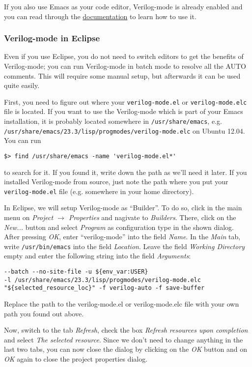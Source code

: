 If you also use Emacs as your code editor,
Verilog-mode is already enabled and you can read through the
\href{http://www.veripool.org/wiki/verilog-mode/Documentation}{documentation} to
learn how to use it.

\subsubsection{Verilog-mode in Eclipse}

Even if you use Eclipse, you do not need to switch editors to get the
benefits of Verilog-mode; you can run Verilog-mode in batch mode to
resolve all the AUTO comments. This will require some manual setup, but
afterwards it can be used quite easily.

First, you need to figure out where your \verb|verilog-mode.el| or
\verb|verilog-mode.elc| file is located. If you want to use the
Verilog-mode which is part of your Emacs installation, it is probably located
somewhere in \verb|/usr/share/emacs|, e.g.
\verb|/usr/share/emacs/23.3/lisp/progmodes/verilog-mode.elc| on Ubuntu 12.04.
You can run
\begin{verbatim}
$> find /usr/share/emacs -name 'verilog-mode.el*'
\end{verbatim}
to search for it. If you found it, write down the path as we'll need it later.
If you installed Verilog-mode from source, just note the path where you put
your \verb|verilog-mode.el| file (e.g. somewhere in your home directory).

In Eclipse, we will setup Verilog-mode as ``Builder''. To do so, click in the
main menu on \emph{Project $\rightarrow$ Properties} and nagivate to
\emph{Builders}. There, click on the \emph{New...} button and select
\emph{Program} as configuration type in the shown dialog. After pressing
\emph{OK}, enter ``verilog-mode'' into the field \emph{Name}. In the \emph{Main}
tab, write \verb|/usr/bin/emacs| into the field \emph{Location}. Leave the field
\emph{Working Directory} empty and enter the following string into the field
\emph{Arguments}:
\begin{verbatim}
--batch --no-site-file -u ${env_var:USER}
-l /usr/share/emacs/23.3/lisp/progmodes/verilog-mode.elc
"${selected_resource_loc}" -f verilog-auto -f save-buffer
\end{verbatim}

Replace the path to the verilog-mode.el or verilog-mode.elc file with your own
path you found out above.

Now, switch to the tab \emph{Refresh}, check the box \emph{Refresh resources
upon completion} and select \emph{The selected resource}. Since we don't need
to change anything in the last two tabs, you can now close the dialog by
clicking on the \emph{OK} button and on \emph{OK} again to close the project
properties dialog.

